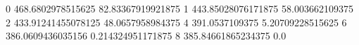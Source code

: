 0 468.6802978515625 82.83367919921875
1 443.85028076171875 58.003662109375
2 433.91241455078125 48.0657958984375
4 391.0537109375 5.20709228515625
6 386.0609436035156 0.214324951171875
8 385.84661865234375 0.0

